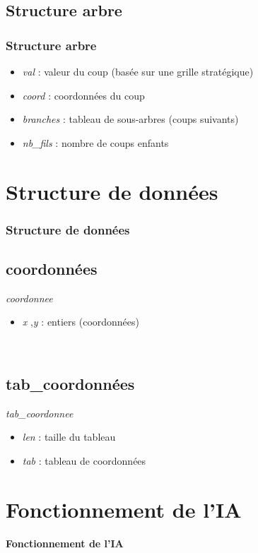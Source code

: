 \documentclass[9pt]{beamer}
\begin{document}
\subsection{Structure arbre}
\begin{frame}
  \frametitle{Structure arbre}
  \begin{itemize}
    \item \textit{val} :  valeur du coup (basée sur une grille stratégique)
    \item \textit{coord} : coordonnées du coup
    \item \textit{branches} : tableau de sous-arbres (coups suivants)
    \item \textit{nb\_fils} : nombre de coups enfants
  \end{itemize}
\end{frame}

\section{Structure de données}
\begin{frame}
  \frametitle{Structure de données}
  \subsection{coordonnées}
  \textit{coordonnee}
  \begin{itemize}
    \item \textit{x} ,\textit{y} : entiers (coordonnées)
  \end{itemize}

~

  \subsection{tab\_coordonnées}
  \textit{tab\_coordonnee}
  \begin{itemize}
    \item \textit{len} : taille du tableau
    \item \textit{tab} : tableau de coordonnées
  \end{itemize}
\end{frame}

\section{Fonctionnement de l'IA}
\begin{frame}
  \begin{center}
      \Large \textbf{Fonctionnement de l'IA}
  \end{center}
\end{frame}
\end{document}
